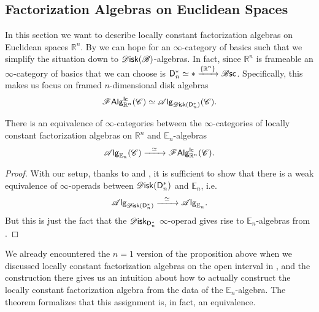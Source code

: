 \documentclass[../text.tex]{subfiles}
\begin{document}
\subsection{Factorization Algebras on Euclidean Spaces}\label{ssec:lcfa_on_Rn}

In this section we want to describe locally constant factorization algebras on Euclidean spaces $\mathbb{R}^n$. By  we can hope for an $\infty$-category of basics such that we simplify the situation down to $\disk (\bstr)$-algebras. In fact, since $\mathbb{R}^n$ is frameable an $\infty$-category of basics that we can choose is $\mathsf{D}_n^* \simeq * \xrightarrow{\{ \mathbb{R}^n\}} \mathscr{B} \mathsf{sc}$. Specifically, this makes us focus on framed $n$-dimensional disk algebras
%
\begin{equation}
    \lcfa_{\mathbb{R}^n} (\catC) \simeq \alg{\disk (\mathsf{D}_n^*)} (\catC).
\end{equation}
%

\begin{theorem}
    There is an equivalence of $\infty$-categories between the $\infty$-categories of locally constant factorization algebras on $\mathbb{R}^n$ and $\mathbb{E}_n$-algebras
    \begin{equation}
        \alg{\mathbb{E}_n} (\catC) \xrightarrow{\ \ \simeq \ \ } \lcfa_{\mathbb{R}^n} (\catC).
    \end{equation}
\end{theorem}

\begin{proof}
    With our setup, thanks to  and , it is sufficient to show that there is a weak equivalence of $\infty$-operads between $\disk (\mathsf{D}_n^*)$ and $\mathbb{E}_n$, i.e.
    \begin{equation}
        \alg{\disk (\mathsf{D}_n^*)} \xrightarrow{\ \ \simeq \ \ } \alg{\mathbb{E}_n}.
    \end{equation}
    But this is just the fact that the $\disk_{\mathsf{D}_n^*}$ $\infty$-operad gives rise to $\mathbb{E}_n$-algebras from .
\end{proof}

\begin{remark}
    We already encountered the $n=1$ version of the proposition above when we discussed locally constant factorization algebras on the open interval in , and the construction there gives us an intuition about how to actually construct the locally constant factorization algebra from the data of the $\mathbb{E}_n$-algebra. The theorem formalizes that this assignment is, in fact, an equivalence.
\end{remark}
\end{document}
